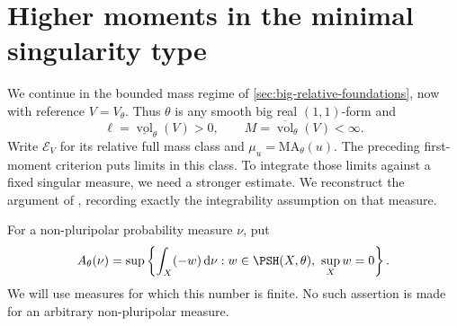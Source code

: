 \section{Higher moments in the minimal singularity type}
\label{sec:big-minimal-moments}

We continue in the bounded mass regime of \cref{sec:big-relative-foundations}, now with reference $V=V_\theta$. Thus $\theta$ is any smooth big real $(1,1)$-form and
\[
 \ell=\underline{\operatorname{vol}}_\theta(V)>0,
 \qquad M=\overline{\operatorname{vol}}_\theta(V)<\infty.
\]
Write $\mathcal E_V$ for its relative full mass class and $\mu_u=\mathrm{MA}_\theta(u)$. The preceding first-moment criterion puts limits in this class. To integrate those limits against a fixed singular measure, we need a stronger estimate. We reconstruct the argument of \cite[Proposition 5.1]{XL26}, recording exactly the integrability assumption on that measure.

For a non-pluripolar probability measure $\nu$, put
\[
 A_\theta(\nu)=\sup\left\{\int_X(-w)\,\mathrm{d}\nu:
             w\in\PSH(X,\theta),\ \sup_Xw=0\right\}.
\]
We will use measures for which this number is finite. No such assertion is made for an arbitrary non-pluripolar measure.

